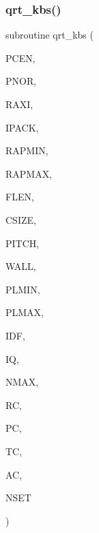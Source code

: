 \subsubsection{\texorpdfstring{qrt\+\_\+kbs()}{qrt\_kbs()}}
{\footnotesize\ttfamily subroutine qrt\+\_\+kbs (\begin{DoxyParamCaption}\item[{double precision, dimension(3)}]{P\+C\+EN,  }\item[{double precision, dimension(3)}]{P\+N\+OR,  }\item[{double precision, dimension(3)}]{R\+A\+XI,  }\item[{integer}]{I\+P\+A\+CK,  }\item[{double precision}]{R\+A\+P\+M\+IN,  }\item[{double precision}]{R\+A\+P\+M\+AX,  }\item[{double precision}]{F\+L\+EN,  }\item[{double precision}]{C\+S\+I\+ZE,  }\item[{double precision}]{P\+I\+T\+CH,  }\item[{double precision}]{W\+A\+LL,  }\item[{double precision}]{P\+L\+M\+IN,  }\item[{double precision}]{P\+L\+M\+AX,  }\item[{integer}]{I\+DF,  }\item[{integer}]{IQ,  }\item[{integer}]{N\+M\+AX,  }\item[{double precision, dimension(nmax)}]{RC,  }\item[{double precision, dimension(nmax)}]{PC,  }\item[{double precision, dimension(nmax)}]{TC,  }\item[{double precision, dimension(nmax)}]{AC,  }\item[{integer}]{N\+S\+ET }\end{DoxyParamCaption})}

